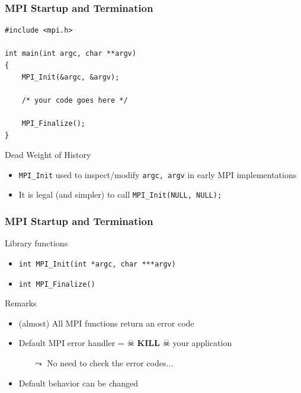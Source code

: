 \documentclass[xcolor={x11names,svgnames,psnames}]{beamer}
\begin{document}
\begin{frame}[fragile=singleslide]
  \frametitle{MPI Startup and Termination}
    
\begin{verbatim}
#include <mpi.h>

int main(int argc, char **argv)
{
    MPI_Init(&argc, &argv);

    /* your code goes here */
    
    MPI_Finalize();
}
\end{verbatim} 

\begin{block}{Dead Weight of History}
  \begin{itemize}
  \item \texttt{MPI_Init} used to inspect/modify \texttt{argc, argv} in early MPI implementations
  \item It is \alert{legal} (and simpler) to call \texttt{MPI_Init(NULL, NULL);}
  \end{itemize}
\end{block}
\end{frame}


\begin{frame}[fragile=singleslide]
  \frametitle{MPI Startup and Termination}

  \begin{exampleblock}{Library functions}
    \begin{itemize}
    \item \texttt{int MPI_Init(int *argc, char ***argv)}
    \item \texttt{int MPI_Finalize()}
    \end{itemize}
  \end{exampleblock}

  \begin{block}{Remarks}
    \begin{itemize}
    \item (almost) All MPI functions return an \alert{error code}
    \item Default MPI error handler = $\skull$ \textbf{KILL} $\skull$ your application
      \begin{itemize}
      \item[$\leadsto$] No need to check the error codes...
      \end{itemize}
    \item Default behavior can be changed
    \end{itemize}
  \end{block}
  
\end{frame}
\end{document}
